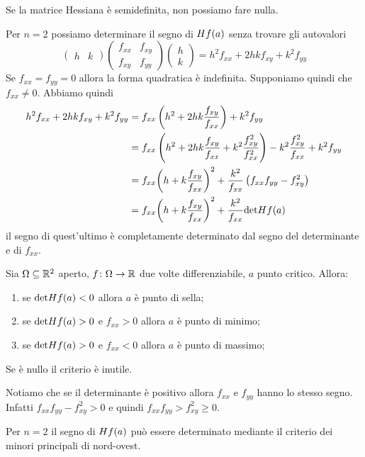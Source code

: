 \documentclass[a4paper]{article}
\begin{document}
\begin{radioactive}
Se la matrice Hessiana è semidefinita, non possiamo fare nulla.

Per \(n=2\) possiamo determinare il segno di \(H f(a)\) senza trovare gli autovalori
\[
    \begin{pmatrix}
        h & k
    \end{pmatrix}
    \begin{pmatrix}
        f_{xx} & f_{xy} \\
        f_{xy} & f_{yy}
    \end{pmatrix}
    \begin{pmatrix}
        h \\ k
    \end{pmatrix}
    =
    h^2 f_{xx} + 2hkf_{xy} + k^2 f_{yy}
\]
Se \(f_{xx} = f_{yy} = 0\) allora la forma quadratica è indefinita.
Supponiamo quindi che \(f_{xx} \neq 0\).
Abbiamo quindi
\begin{align*}
    h^2 f_{xx} + 2hk f_{xy} + k^2 f_{yy}
    &= f_{xx} \left(h^2 + 2hk \frac{f_{xy}}{f_{xx}}\right)
    + k^2 f_{yy} \\
    &= f_{xx} \left(
        h^2 + 2hk \frac{f_{xy}}{f_{xx}} + k^2 \frac{f_{xy}^2}{f_{xx}^2}
    \right) - k^2 \frac{f_{xy}^2}{f_{xx}} + k^2 f_{yy} \\
    &= f_{xx} {\left(h + k \frac{f_{xy}}{f_{xx}}\right)}^2
    + \frac{k^2}{f_{xx}} \left(f_{xx}f_{yy} - f_{xy}^2\right) \\
    &= f_{xx} {\left(h + k \frac{f_{xy}}{f_{xx}}\right)}^2
    + \frac{k^2}{f_{xx}} \text{det} H f(a)
\end{align*}
il segno di quest'ultimo è completamente determinato dal segno del determinante e di \(f_{xx}\).

\begin{snippettheorem}{}
    Sia \(\Omega \subseteq \mathbb{R}^2\) aperto, \(f\colon \Omega \to \mathbb{R}\) due volte
    differenziabile, \(a\) punto critico. Allora:
    \begin{enumerate}
        \item se \(\text{det} H f(a) < 0\) allora \(a\) è punto di sella;
        \item se \(\text{det} H f(a) > 0\) e \(f_{xx}>0\) allora \(a\) è punto di minimo;
        \item se \(\text{det} H f(a) > 0\) e \(f_{xx}<0\) allora \(a\) è punto di massimo;
    \end{enumerate}
    Se è nullo il criterio è inutile.
\end{snippettheorem}

Notiamo che se il determinante è positivo allora \(f_{xx}\) e \(f_{yy}\) hanno lo stesso segno.
Infatti \(f_{xx}f_{yy} - f_{xy}^2 > 0\) e quindi
\(f_{xx}f_{yy} > f_{xy}^2 \geq 0\).

Per \(n=2\) il segno di \(H f(a)\) può essere determinato mediante il criterio dei minori
principali di nord-ovest.
\end{radioactive}
\end{document}
